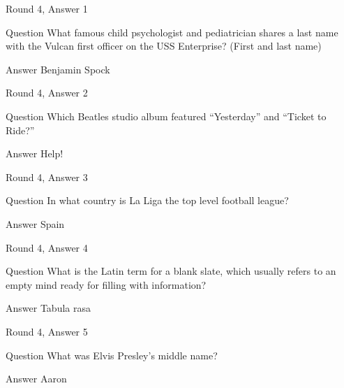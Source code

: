 \documentclass[11pt]{beamer}
\begin{document}
\begin{frame}[t]{Round 4, Answer 1}
\vspace{2em}
\begin{block}{Question}
What famous child psychologist and pediatrician shares a last name with the Vulcan first officer on the USS Enterprise? (First and last name)
\end{block}
\pause{}
\begin{block}{Answer}
Benjamin Spock
\end{block}
\end{frame}
    

\begin{frame}[t]{Round 4, Answer 2}
\vspace{2em}
\begin{block}{Question}
Which Beatles studio album featured ``Yesterday'' and ``Ticket to Ride?''
\end{block}
\pause{}
\begin{block}{Answer}
Help!
\end{block}
\end{frame}
    

\begin{frame}[t]{Round 4, Answer 3}
\vspace{2em}
\begin{block}{Question}
In what country is La Liga the top level football league\@?
\end{block}
\pause{}
\begin{block}{Answer}
Spain
\end{block}
\end{frame}
    

\begin{frame}[t]{Round 4, Answer 4}
\vspace{2em}
\begin{block}{Question}
What is the Latin term for a blank slate, which usually refers to an empty mind ready for filling with information\@?
\end{block}
\pause{}
\begin{block}{Answer}
Tabula rasa
\end{block}
\end{frame}
    

\begin{frame}[t]{Round 4, Answer 5}
\vspace{2em}
\begin{block}{Question}
What was Elvis Presley's middle name\@?
\end{block}
\pause{}
\begin{block}{Answer}
Aaron
\end{block}
\end{frame}
    
\end{document}

